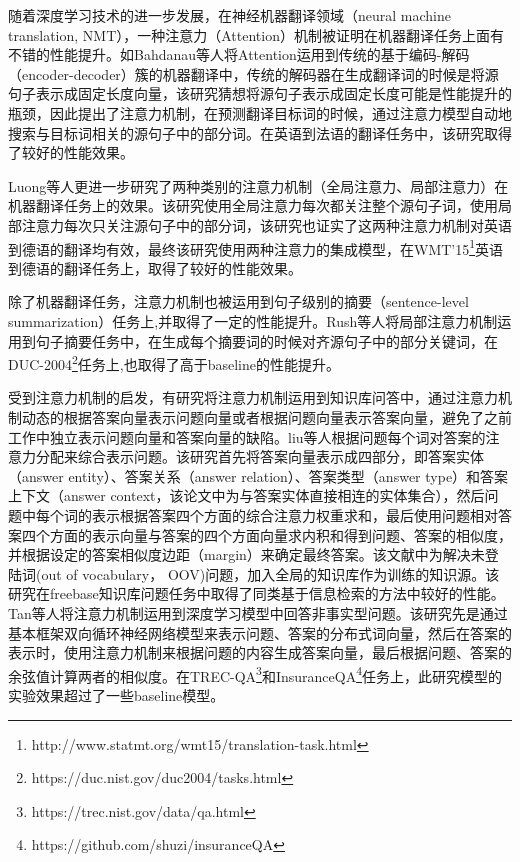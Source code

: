 随着深度学习技术的进一步发展，在神经机器翻译领域（neural machine translation, NMT），一种注意力（Attention）机制被证明在机器翻译任务上面有不错的性能提升。如Bahdanau\cite{Bahdanau}等人将Attention运用到传统的基于编码-解码（encoder-decoder）簇的机器翻译中，传统的解码器在生成翻译词的时候是将源句子表示成固定长度向量，该研究猜想将源句子表示成固定长度可能是性能提升的瓶颈，因此提出了注意力机制，在预测翻译目标词的时候，通过注意力模型自动地搜索与目标词相关的源句子中的部分词。在英语到法语的翻译任务中，该研究取得了较好的性能效果。

Luong\cite{Luong}等人更进一步研究了两种类别的注意力机制（全局注意力、局部注意力）在机器翻译任务上的效果。该研究使用全局注意力每次都关注整个源句子词，使用局部注意力每次只关注源句子中的部分词，该研究也证实了这两种注意力机制对英语到德语的翻译均有效，最终该研究使用两种注意力的集成模型，在WMT'15\footnote{http://www.statmt.org/wmt15/translation-task.html}英语到德语的翻译任务上，取得了较好的性能效果。

除了机器翻译任务，注意力机制也被运用到句子级别的摘要（sentence-level summarization）任务上,并取得了一定的性能提升。Rush\cite{Rush}等人将局部注意力机制运用到句子摘要任务中，在生成每个摘要词的时候对齐源句子中的部分关键词，在DUC-2004\footnote{https://duc.nist.gov/duc2004/tasks.html}任务上,也取得了高于baseline的性能提升。

受到注意力机制的启发，有研究将注意力机制运用到知识库问答中，通过注意力机制动态的根据答案向量表示问题向量或者根据问题向量表示答案向量，避免了之前工作中独立表示问题向量和答案向量的缺陷。liu\cite{Liu}等人根据问题每个词对答案的注意力分配来综合表示问题。该研究首先将答案向量表示成四部分，即答案实体（answer entity）、答案关系（answer relation）、答案类型（answer type）和答案上下文（answer context，该论文中为与答案实体直接相连的实体集合），然后问题中每个词的表示根据答案四个方面的综合注意力权重求和，最后使用问题相对答案四个方面的表示向量与答案的四个方面向量求内积和得到问题、答案的相似度，并根据设定的答案相似度边距（margin）来确定最终答案。该文献中为解决未登陆词(out of vocabulary， OOV)问题，加入全局的知识库作为训练的知识源。该研究在freebase知识库问题任务中取得了同类基于信息检索的方法中较好的性能。Tan\cite{Tan}等人将注意力机制运用到深度学习模型中回答非事实型问题。该研究先是通过基本框架双向循环神经网络模型来表示问题、答案的分布式词向量，然后在答案的表示时，使用注意力机制来根据问题的内容生成答案向量，最后根据问题、答案的余弦值计算两者的相似度。在TREC-QA\footnote{https://trec.nist.gov/data/qa.html}和InsuranceQA\footnote{https://github.com/shuzi/insuranceQA}任务上，此研究模型的实验效果超过了一些baseline模型。

